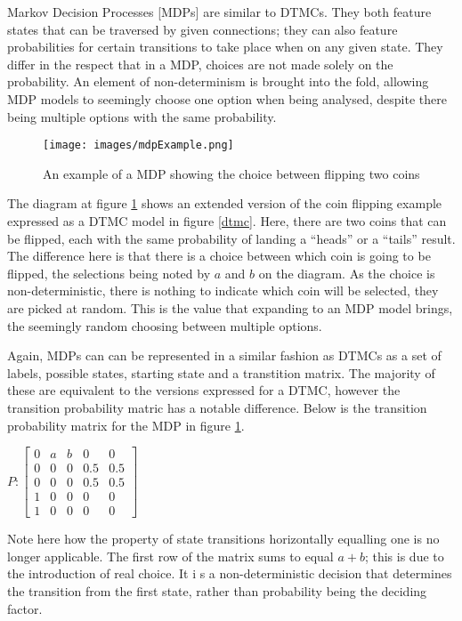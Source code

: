 \documentclass{l4proj}
\begin{document}
Markov Decision Processes [MDPs] are similar to DTMCs. They both feature states that can be traversed by given connections; they can also feature probabilities for certain transitions to take place when on any given state. They differ in the respect that in a MDP, choices are not made solely on the probability. An element of non-determinism is brought into the fold, allowing MDP models to seemingly choose one option when being analysed, despite there being multiple options with the same probability. 

\begin{figure}[ht!]
\centering
\texttt{[image: images/mdpExample.png]}
\caption{An example of a MDP showing the choice between flipping two coins}
\label{mdp}
\end{figure}

The diagram at figure \ref{mdp} shows an extended version of the coin flipping example expressed as a DTMC model in figure \ref{dtmc}. Here, there are two coins that can be flipped, each with the same probability of landing a ``heads'' or a ``tails'' result. The difference here is that there is a choice between which coin is going to be flipped, the selections being noted by $a$ and $b$ on the diagram. As the choice is non-deterministic, there is nothing to indicate which coin will be selected, they are picked at random. This is the value that expanding to an MDP model brings, the seemingly random choosing between multiple options.

Again, MDPs can can be represented in a similar fashion as DTMCs as a set of labels, possible states, starting state and a transtition matrix. The majority of these are equivalent to the versions expressed for a DTMC, however the transition probability matric has a notable difference. Below is the transition probability matrix for the MDP in figure \ref{mdp}.\\

\centerline{$P :\begin{bmatrix}
0 & a & b & 0 & 0\\ 
0 & 0 & 0 & 0.5 & 0.5\\ 
0 & 0 & 0 & 0.5 & 0.5\\ 
1 & 0 & 0 & 0 & 0\\ 
1 & 0 & 0 & 0 & 0
\end{bmatrix}$}

Note here how the property of state transitions horizontally equalling one is no longer applicable. The first row of the matrix sums to equal $a+b$; this is due to the introduction of real choice. It i s a non-deterministic decision that determines the transition from the first state, rather than probability being the deciding factor.
\end{document}
